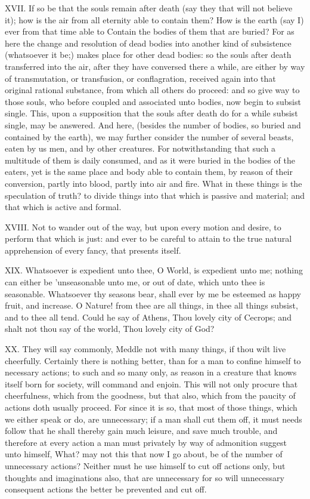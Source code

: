 XVII. If so be that the souls remain after death (say they that will not
believe it); how is the air from all eternity able to contain them? How is
the earth (say I) ever from that time able to Contain the bodies of them
that are buried? For as here the change and resolution of dead bodies into
another kind of subsistence (whatsoever it be;) makes place for other dead
bodies: so the souls after death transferred into the air, after they have
conversed there a while, are either by way of transmutation, or
transfusion, or conflagration, received again into that original rational
substance, from which all others do proceed: and so give way to those
souls, who before coupled and associated unto bodies, now begin to subsist
single. This, upon a supposition that the souls after death do for a while
subsist single, may be answered. And here, (besides the number of bodies,
so buried and contained by the earth), we may further consider the number
of several beasts, eaten by us men, and by other creatures. For
notwithstanding that such a multitude of them is daily consumed, and as it
were buried in the bodies of the eaters, yet is the same place and body
able to contain them, by reason of their conversion, partly into blood,
partly into air and fire. What in these things is the speculation of
truth? to divide things into that which is passive and material; and that
which is active and formal.

XVIII. Not to wander out of the way, but upon every motion and desire,
to perform that which is just: and ever to be careful to attain to the
true natural apprehension of every fancy, that presents itself.

XIX. Whatsoever is expedient unto thee, O World, is expedient unto me;
nothing can either be 'unseasonable unto me, or out of date, which unto
thee is seasonable. Whatsoever thy seasons bear, shall ever by me be
esteemed as happy fruit, and increase. O Nature! from thee are all things,
in thee all things subsist, and to thee all tend. Could he say of Athens,
Thou lovely city of Cecrops; and shalt not thou say of the world, Thou
lovely city of God?

XX. They will say commonly, Meddle not with many things, if thou wilt
live cheerfully. Certainly there is nothing better, than for a man to
confine himself to necessary actions; to such and so many only, as reason
in a creature that knows itself born for society, will command and enjoin.
This will not only procure that cheerfulness, which from the goodness, but
that also, which from the paucity of actions doth usually proceed. For
since it is so, that most of those things, which we either speak or do,
are unnecessary; if a man shall cut them off, it must needs follow that he
shall thereby gain much leisure, and save much trouble, and therefore at
every action a man must privately by way of admonition suggest unto
himself, What? may not this that now I go about, be of the number of
unnecessary actions? Neither must he use himself to cut off actions only,
but thoughts and imaginations also, that are unnecessary for so will
unnecessary consequent actions the better be prevented and cut off.

